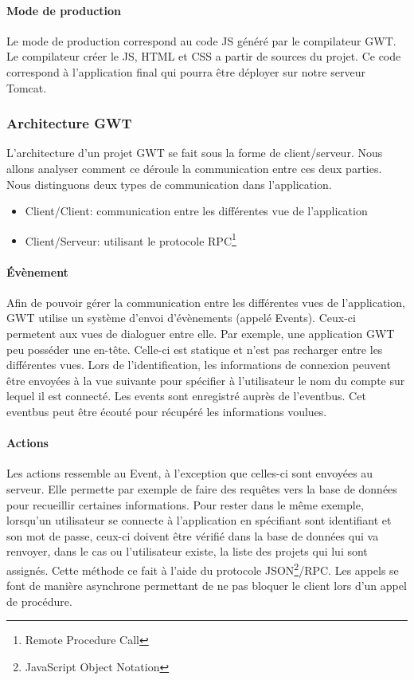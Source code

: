\paragraph{Mode de production}
Le mode de production correspond au code JS généré par le compilateur GWT. Le compilateur créer le JS, HTML et CSS a partir de sources du projet. Ce code correspond à l'application final qui pourra être déployer sur notre serveur Tomcat.

\subsubsection{Architecture GWT}
L'architecture d'un projet GWT se fait sous la forme de client/serveur. Nous allons analyser comment ce déroule la communication entre ces deux parties. Nous distinguons deux types de communication dans l'application.
\begin{itemize}
\item Client/Client: communication entre les différentes vue de l'application
\item Client/Serveur: utilisant le protocole RPC\footnote{Remote Procedure Call} 
\end{itemize}
\paragraph{Évènement}
Afin de pouvoir gérer la communication entre les différentes vues de l'application, GWT utilise un système d'envoi d'évènements (appelé Events). Ceux-ci permetent aux vues de dialoguer entre elle.
Par exemple, une application GWT peu posséder une en-tête. Celle-ci est statique et n'est pas recharger entre les différentes vues. Lors de l'identification, les informations de connexion peuvent être envoyées à la vue suivante pour spécifier à l'utilisateur le nom du compte sur lequel il est connecté.
Les events sont enregistré auprès de l'eventbus. Cet eventbus peut être écouté pour récupéré les informations voulues.

\paragraph{Actions}
Les actions ressemble au Event, à l'exception que celles-ci sont envoyées au serveur. Elle permette par exemple de faire des requêtes vers la base de données pour recueillir certaines informations. Pour rester dans le même exemple, lorsqu'un utilisateur se connecte à l'application en spécifiant sont identifiant et son mot de passe, ceux-ci doivent être vérifié dans la base de données qui va renvoyer, dans le cas ou l'utilisateur existe, la liste des projets qui lui sont assignés. Cette méthode ce fait à l'aide du protocole JSON\footnote{JavaScript Object Notation}/RPC. Les appels se font de manière asynchrone permettant de ne pas bloquer le client lors d'un appel de procédure.
	
